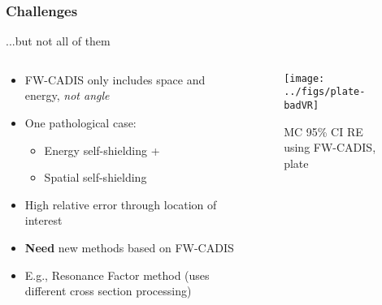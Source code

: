 \documentclass[xcolor=x11names,compress]{beamer}
\renewcommand{\(}{\begin{columns}}
\renewcommand{\)}{\end{columns}}
\newcommand{\<}[1]{\begin{column}{#1}}
\renewcommand{\>}{\end{column}}
\begin{document}
\begin{frame}[fragile]
  \frametitle{Challenges}

	...but not all of them
	\begin{columns}
  	\begin{column}{0.5\textwidth}
  	\begin{center}
		\begin{itemize}
		\item FW-CADIS only includes space and energy, 
			\textit{not angle}
		\item One pathological case:
		\begin{itemize}
		\item Energy self-shielding +
		\item Spatial self-shielding
		\end{itemize}
		\item High relative error through location of interest
		\item \textbf{Need} new methods based on FW-CADIS
		\item E.g., Resonance Factor method (uses different cross section processing)
		\end{itemize}
	\end{center}
  	\end{column}
 	\begin{column}{0.5\textwidth}
  	\begin{center}
  	\begin{figure}
  		\texttt{[image: ../figs/plate-badVR]}
  		\caption{MC 95\% CI RE using FW-CADIS, plate}
  	\end{figure}
  	\end{center}
  	\end{column}
	\end{columns}
  
\end{frame}


\end{document}
